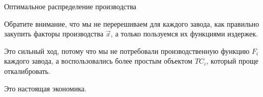 \documentclass{beamer}
\begin{document}
\begin{frame}{Оптимальное распределение производства}

Обратите внимание, что мы не перерешиваем для каждого завода, как правильно закупить факторы производства $\vec x$, а только пользуемся их функциями издержек. 

Это сильный ход, потому что мы не потребовали производственную функцию $F_i$ каждого завода, а воспользовались более простым объектом $TC_i$, который проще откалибровать.

Это настоящая экономика.

\end{frame}
%
%
%
%
%
%
%
%
%
%
%
%
%
%
%
%
%
\end{document}
